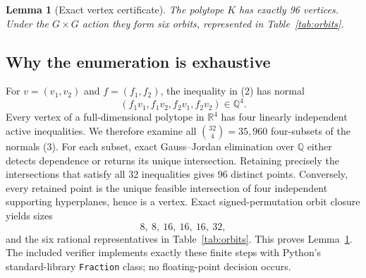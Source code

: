 \documentclass[11pt]{article}
\newtheorem{lemma}{Lemma}
\begin{document}
\begin{lemma}[Exact vertex certificate]\label{lem:certificate}
The polytope $K$ has exactly 96 vertices. Under the $G\times G$ action they
form six orbits, represented in Table~\ref{tab:orbits}.
\end{lemma}

\subsection*{Why the enumeration is exhaustive}

For $v=(v_1,v_2)$ and $f=(f_1,f_2)$, the inequality in (2) has normal
\[
 (f_1v_1,f_1v_2,f_2v_1,f_2v_2)\in\mathbb Q^4. \tag{3}
\]
Every vertex of a full-dimensional polytope in $\mathbb R^4$ has four
linearly independent active inequalities. We therefore examine all
\(\binom{32}{4}=35{,}960\) four-subsets of the normals (3). For each subset,
exact Gauss--Jordan elimination over $\mathbb Q$ either detects dependence or
returns its unique intersection. Retaining precisely the intersections that
satisfy all 32 inequalities gives 96 distinct points. Conversely, every
retained point is the unique feasible intersection of four independent
supporting hyperplanes, hence is a vertex. Exact signed-permutation orbit
closure yields sizes
\[
 8,\ 8,\ 16,\ 16,\ 16,\ 32,
\]
and the six rational representatives in Table~\ref{tab:orbits}. This proves
Lemma~\ref{lem:certificate}. The included verifier implements exactly these
finite steps with Python's standard-library \texttt{Fraction} class; no
floating-point decision occurs.
\end{document}
